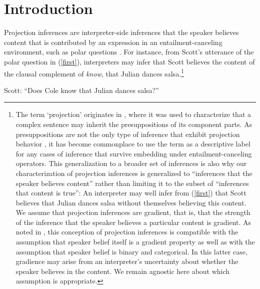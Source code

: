 \documentclass[11pt,fleqn]{article}
\newcommand{\6}{\mbox{$[\hspace*{-.6mm}[$}}
\newcommand{\9}{\mbox{$]\hspace*{-.6mm}]$}}
\begin{document}
\section{Introduction}\label{s1}

Projection inferences are interpreter-side inferences that the speaker believes content that is contributed by an expression in an entailment-canceling environment, such as polar questions \citep[see, e.g.,][]{kiparsky-kiparsky70,potts05}. For instance, from Scott's utterance of the polar question in (\ref{first}), interpreters may infer that Scott believes the content of the clausal complement of {\em know}, that Julian dances salsa.\footnote{\label{f:first}The term `projection' originates in \cite{langendoen-savin71}, where it was used to characterize that a complex sentence may inherit the presuppositions of its component parts. As presuppositions are not the only type of inference that exhibit projection behavior \citep[see, e.g.,][]{ccmg90,potts05,simons05}, it has become commonplace to use the term as a descriptive label for any cases of inference that survive embedding under entailment-canceling operators. This generalization to a broader set of inferences is also why our characterization of projection inferences is generalized to ``inferences that the speaker believes content'' rather than limiting it to the subset of ``inferences that content is true'': An interpreter may well infer from (\ref{first}) that Scott believes that Julian dances salsa without themselves believing this content. We assume that projection inferences are gradient, that is, that the strength of the inference that the speaker believes a particular content is gradient. As noted in \cite{tbd-variability}, this conception of projection inferences is compatible with the assumption that speaker belief itself is a gradient property as well as with the assumption that speaker belief is binary and categorical. In this latter case, gradience may arise from an interpreter's uncertainty about whether the speaker believes in the content. We remain agnostic here about which assumption is appropriate.}

\begin{exe}
\ex\label{first} Scott: ``Does Cole know that Julian dances salsa?''
\end{exe}
\end{document}
